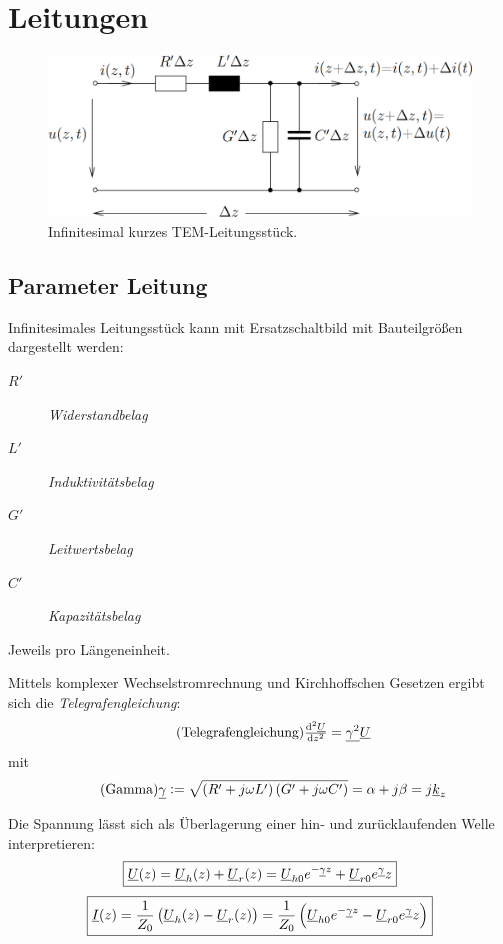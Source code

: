 \chapter{Leitungen}
\begin{figure}[H]
    \centering
    \includegraphics[width=\textwidth]{images/leitung.png}
    \caption{Infinitesimal kurzes TEM-Leitungsstück.}
\end{figure}

\section{Parameter Leitung}
Infinitesimales Leitungsstück kann mit Ersatzschaltbild mit Bauteilgrößen dargestellt werden:
\begin{description}
    \item[$R'$] \emph{Widerstandbelag}
    \item[$L'$] \emph{Induktivitätsbelag}
    \item[$G'$] \emph{Leitwertsbelag}
    \item[$C'$] \emph{Kapazitätsbelag}
\end{description}
Jeweils pro Längeneinheit.

Mittels komplexer Wechselstromrechnung und Kirchhoffschen Gesetzen ergibt sich die \emph{Telegrafengleichung}:
\begin{equation}
    \tag{Telegrafengleichung}
    \od[2]{\UU}{z} = \underline{\gamma^2}\UU
    \label{eqn:Telegraf}
\end{equation}
mit
\begin{equation}
    \tag{Gamma}
    \underline{\gamma} := \sqrt{\left(R'+j\omega L'\right)\left(G'+j\omega C'\right)} = \alpha + j\beta = j\underline{k}_z
    \label{eqn:gamma}
\end{equation}

Die Spannung lässt sich als Überlagerung einer hin- und zurücklaufenden Welle interpretieren:
\begin{equation}
    \boxed{ \underline{U}(z)=\underline{U}_h(z)+\underline{U}_r(z) = \underline{U}_{h0} e^{-\underline{\gamma} z}+\underline{U}_{r0} e^{\underline{\gamma}}z }
\label{eqn:u-uberlagerung}
\end{equation}
\begin{equation}
    \boxed{ \underline{I}(z)=\frac{1}{Z_0} \left( \underline{U}_h(z)-\underline{U}_r(z)\right) = \frac{1}{Z_0} \left( \underline{U}_{h0} e^{-\underline{\gamma} z}-\underline{U}_{r0} e^{\underline{\gamma}}z \right) }
\label{eqn:i-uberlagerung}
\end{equation}

